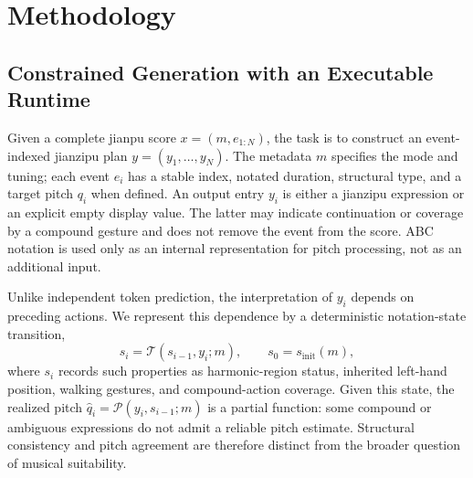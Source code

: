 \documentclass[11pt]{article}
\begin{document}


\section{Methodology}
\subsection{Constrained Generation with an Executable Runtime}\label{sec:formulation}
Given a complete jianpu score $x=(m,e_{1:N})$, the task is to construct an event-indexed jianzipu plan $y=(y_1,\ldots,y_N)$. The metadata $m$ specifies the mode and tuning; each event $e_i$ has a stable index, notated duration, structural type, and a target pitch $q_i$ when defined. An output entry $y_i$ is either a jianzipu expression or an explicit empty display value. The latter may indicate continuation or coverage by a compound gesture and does not remove the event from the score. ABC notation is used only as an internal representation for pitch processing, not as an additional input.

Unlike independent token prediction, the interpretation of $y_i$ depends on preceding actions. We represent this dependence by a deterministic notation-state transition,
\begin{equation}
    s_i=\mathcal{T}(s_{i-1},y_i;m),\qquad s_0=s_{\mathrm{init}}(m),
    \label{eq:notation-state}
\end{equation}
where $s_i$ records such properties as harmonic-region status, inherited left-hand position, walking gestures, and compound-action coverage. Given this state, the realized pitch $\hat q_i=\mathcal{P}(y_i,s_{i-1};m)$ is a partial function: some compound or ambiguous expressions do not admit a reliable pitch estimate. Structural consistency and pitch agreement are therefore distinct from the broader question of musical suitability.
\end{document}
